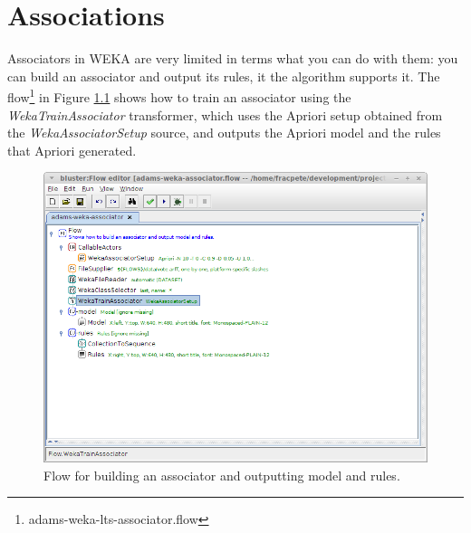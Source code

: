 %

\chapter{Associations}
\label{associations}

Associators in WEKA are very limited in terms what you can do with them: you
can build an associator and output its rules, it the algorithm supports it.
The flow\footnote{adams-weka-lts-associator.flow} in Figure \ref{associator}
shows how to train an associator using the \textit{WekaTrainAssociator}
transformer, which uses the Apriori setup obtained from the \textit{WekaAssociatorSetup}
source, and outputs the Apriori model and the rules that Apriori generated.

\begin{figure}[htb]
  \centering
  \includegraphics[width=12.0cm]{images/associator.png}
  \caption{Flow for building an associator and outputting model and rules.}
  \label{associator}
\end{figure}
